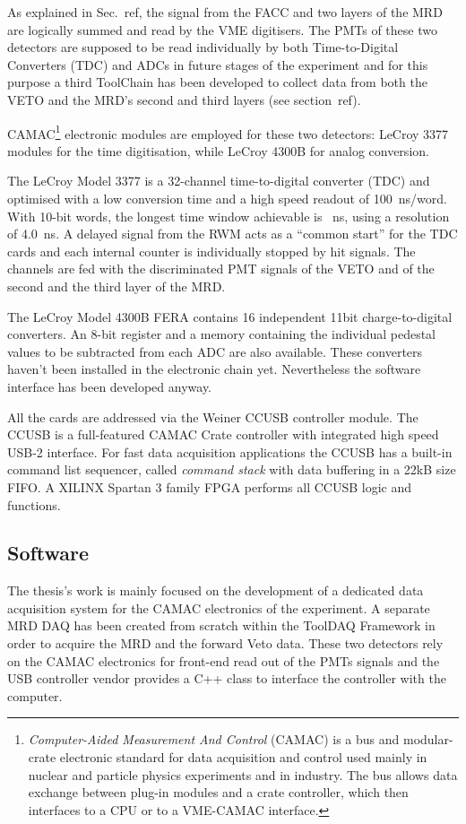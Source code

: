  As explained in Sec.~ref, the signal from the FACC %
 and two layers of the MRD are logically summed and read by the VME digitisers.
 The PMTs of these two detectors are supposed to be read individually by both Time-to-Digital %
 Converters (TDC) and ADCs in future stages of the experiment and for this purpose %
 a third ToolChain has been developed to collect data from both the VETO and %
 the MRD's second and third layers (see section~ref).

 CAMAC\footnote{\emph{Computer-Aided Measurement And Control} (CAMAC) is a bus and modular-crate electronic %
 standard for data acquisition and control used mainly in nuclear and particle physics experiments %
 and in industry.
 The bus allows data exchange between plug-in modules and a crate controller, %
 which then interfaces to a CPU or to a VME-CAMAC interface.} %
 electronic modules are employed for these two detectors: LeCroy 3377 modules for the time %
 digitisation, while LeCroy 4300B for analog conversion.

 The LeCroy Model 3377 is a 32-channel time-to-digital converter (TDC) and %
 optimised with a low conversion time and a high speed readout of 100~ns/word.
 With 10-bit words, the longest time window achievable is ~ns, using a resolution %
 of 4.0~ns.
 A delayed signal from the RWM acts as a ``common start'' for the TDC cards and %
 each internal counter is individually stopped by hit signals.
 The channels are fed with the discriminated PMT signals of the VETO and of the second %
 and the third layer of the MRD.
 
 The LeCroy Model 4300B FERA contains 16 independent 11bit charge-to-digital converters.
 An 8-bit register and a memory containing the individual pedestal values to be subtracted from %
 each ADC are also available.
 These converters haven't been installed in the electronic chain yet.
 Nevertheless the software interface has been developed anyway.
 
 All the cards are addressed via the Weiner CCUSB controller module. 
 The CCUSB is a full-featured CAMAC Crate controller with integrated high speed USB-2 %
 interface.
 For fast data acquisition applications the CCUSB has a built-in command list sequencer, called %
 \emph{command stack} with data buffering in a 22kB size FIFO.
 A XILINX Spartan 3 family FPGA performs all CCUSB logic and functions. 

\subsection{Software}
 The thesis's work is mainly focused on the development of a dedicated data acquisition system %
 for the CAMAC electronics of the experiment.
 A separate MRD DAQ has been created from scratch within the ToolDAQ Framework in order %
 to acquire the MRD and the forward Veto data.
 These two detectors rely on the CAMAC electronics for front-end read out of the PMTs %
 signals and the USB controller vendor provides a C++ class to interface the controller with the %
 computer.
 
